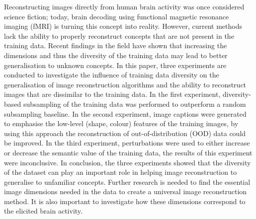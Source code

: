 %
%

\noindent{}Reconstructing images directly from human brain activity was once considered science fiction; today, brain decoding using functional magnetic resonance imaging (fMRI) is turning this concept into reality. However, current methods lack the ability to properly reconstruct concepts that are not present in the training data. Recent findings in the field have shown that increasing the dimensions and thus the diversity of the training data may lead to better generalisation to unknown concepts. In this paper, three experiments are conducted to investigate the influence of training data diversity on the generalisation of image reconstruction algorithms and the ability to reconstruct images that are dissimilar to the training data. In the first experiment, diversity-based subsampling of the training data was performed to outperform a random subsampling baseline. In the second experiment, image captions were generated to emphasise the low-level (shape, colour) features of the training images, by using this approach the reconstruction of out-of-distribution (OOD) data could be improved. In the third experiment, perturbations were used to either increase or decrease the semantic value of the training data, the results of this experiment were inconclusive. In conclusion, the three experiments showed that the diversity of the dataset can play an important role in helping image reconstruction to generalise to unfamiliar concepts. Further research is needed to find the essential image dimensions needed in the data to create a universal image reconstruction method. It is also important to investigate how these dimensions correspond to the elicited brain activity.


